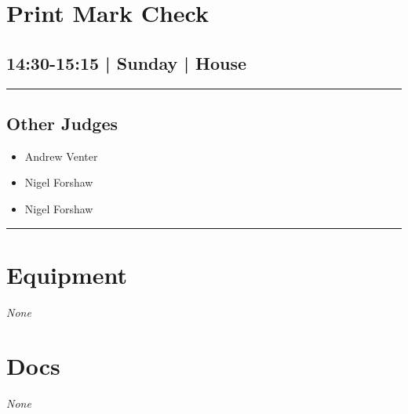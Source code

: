 \documentclass[10pt, A5]{article}
\begin{document}
        \begin{framed}
        \begin{minipage}{\textwidth}

        \setcounter{section}{87}
        \section{Print Mark Check}
        \subsection*{14:30-15:15 | Sunday | House}

        \vspace{0.25cm}
        \hrule
        \vspace{0.25cm}


        \subsection*{Other Judges}
                    

        	\begin{multicols}{2}

		\begin{itemize}
									\item Andrew Venter
									\item Nigel Forshaw
						\end{itemize}

		\vfill\null
		\columnbreak

		\begin{itemize}
									\item Nigel Forshaw
						\end{itemize}

		\vfill\null

		\end{multicols}

    \vspace{0.25cm}
        \hrule
        \vspace{0.25cm}

        \begin{multicols}{2}

		\section*{\faWrench \: Equipment}

				\textit{None}
		
		\vfill\null
		\columnbreak

			\section*{\faFile \: Docs}
		 	\textit{None}
	

		\vfill\null

		\end{multicols}
\end{minipage}
\end{framed}
\end{document}
